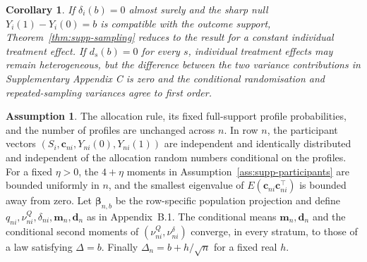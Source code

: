 \documentclass[12pt,a4paper]{article}
\newtheorem{corollary}{Corollary}
\theoremstyle{definition}
\newtheorem{assumption}{Assumption}
\theoremstyle{remark}\newtheorem{remark}{Remark}
\numberwithin{equation}{section}
\begin{document}
\begin{corollary}\label{cor:supp-sharp-stratum}
If $\delta_i(b)=0$ almost surely and the sharp null $Y_i(1)-Y_i(0)=b$ is compatible with the outcome support, Theorem~\ref{thm:supp-sampling} reduces to the result for a constant individual treatment effect. If $d_s(b)=0$ for every $s$, individual treatment effects may remain heterogeneous, but the difference between the two variance contributions in Supplementary Appendix C is zero and the conditional randomisation and repeated-sampling variances agree to first order.
\end{corollary}

\begin{assumption}\label{ass:supp-local}
The allocation rule, its fixed full-support profile probabilities, and the number of profiles are unchanged across $n$. In row $n$, the participant vectors $(S_i,\bm c_{ni},Y_{ni}(0),Y_{ni}(1))$ are independent and identically distributed and independent of the allocation random numbers conditional on the profiles. For a fixed $\eta>0$, the $4+\eta$ moments in Assumption~\ref{ass:supp-participants} are bounded uniformly in $n$, and the smallest eigenvalue of $E(\bm c_{ni}\bm c_{ni}^\top)$ is bounded away from zero. Let $\bm\beta_{n,b}$ be the row-specific population projection and define $q_{ni},\nu^Q_{ni},\delta_{ni},\bm m_n,\bm d_n$ as in Appendix~B.1. The conditional means $\bm m_n,\bm d_n$ and the conditional second moments of $(\nu^Q_{ni},\nu^\delta_{ni})$ converge, in every stratum, to those of a law satisfying $\Delta=b$. Finally $\Delta_n=b+h/\sqrt n$ for a fixed real $h$.
\end{assumption}
\end{document}

